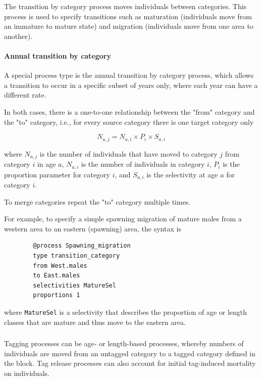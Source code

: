 The transition by category process moves individuals between categories. This process is used to specify transitions such as maturation (individuals move from an immature to mature state) and migration (individuals move from one area to another).

\paragraph{Annual transition by category}

A special process type is the annual transition by category process, which allows a transition to occur in a specific subset of years only, where each year can have a different rate.

In both cases, there is a one-to-one relationship between the "from" category and the "to" category, i.e., for every source category there is one target category only

\begin{equation}
	N_{a,j} = N_{a,i} \times P_i \times S_{a,i}
\end{equation}

where $N_{a,j}$ is the number of individuals that have moved to category $j$ from category $i$ in age $a$, $N_{a,i}$ is the number of individuals in category $i$, $P_i$ is the proportion parameter for category $i$, and $S_{a,i}$ is the selectivity at age $a$ for category $i$.

To merge categories repeat the "to" category multiple times.

For example, to specify a simple spawning migration of mature males from a western area to an eastern (spawning) area, the syntax is

{\small{\begin{verbatim}
		@process Spawning_migration
		type transition_category
		from West.males
		to East.males
		selectivities MatureSel
		proportions 1
		\end{verbatim}}}

where \texttt{MatureSel} is a selectivity that describes the proportion of age or length classes that are mature and thus move to the eastern area.

\subsubsection{}\label{sub:tag_release}

Tagging processes can be age- or length-based processes, whereby numbers of individuals are moved from an untagged category to a tagged category defined in the  block. Tag release processes can also account for initial tag-induced mortality on individuals.

